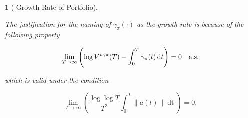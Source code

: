 \documentclass[british]{amsart} \usepackage{lmodern}
\numberwithin{equation}{section} \numberwithin{figure}{section}
\theoremstyle{plain} \newtheorem{thm}{\protect\theoremname}[section]
\theoremstyle{definition} \newtheorem{defn}[thm]{\protect\definitionname}
\theoremstyle{plain} \newtheorem{assumption}[thm]{\protect\assumptionname}
\theoremstyle{plain} \newtheorem{lem}[thm]{\protect\lemmaname}
\theoremstyle{plain} \newtheorem{prop}[thm]{\protect\propositionname}
\theoremstyle{remark} \newtheorem{rem}[thm]{\protect\remarkname}
\theoremstyle{plain} \newtheorem{cor}[thm]{\protect\corollaryname}
\renewcommand{\d}[1]{\mathop{\mathrm{d}{#1}}}
\newcommand{\norm}[1]{\left\lVert#1\right\rVert}
\begin{document}
\begin{lem} [
  {\cite[Equation 1.14]{fernholz2009}}
  Growth Rate of Portfolio]
  \label{thm:growthrateofportfolio}

  The justification for the naming of $\gamma_{\pi}(\cdot)$ as the \textit{growth rate} is because of the following property

  \begin{equation*}
    \lim_{T \to \infty} 
      \left( 
      \log{V^{w,\pi}(T)} - \int_{0}^{T} \gamma_{\pi}(t)\d{t} 
      \right) = 0
    \quad \almostsurely
  \end{equation*}

  which is valid under the condition

  \begin{equation*}
    \lim_{T \to \infty}
      \left(
        \frac{\log \log T}{T^2} \int_{0}^{T} \norm{ a(t) } \d{t}
      \right) = 0,
  \end{equation*}

\end{lem}
\end{document}
